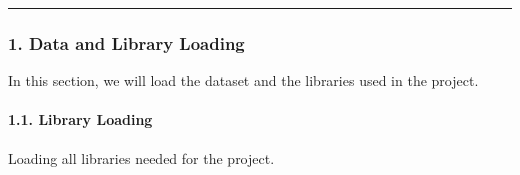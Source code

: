 \documentclass[11pt]{article}
\begin{document}
    \begin{center}\rule{0.5\linewidth}{\linethickness}\end{center}

\subsubsection{1. Data and Library
Loading}\label{data-and-library-loading}

In this section, we will load the dataset and the libraries used in the
project.

    \paragraph{1.1. Library Loading}\label{library-loading}

Loading all libraries needed for the project.
\end{document}
